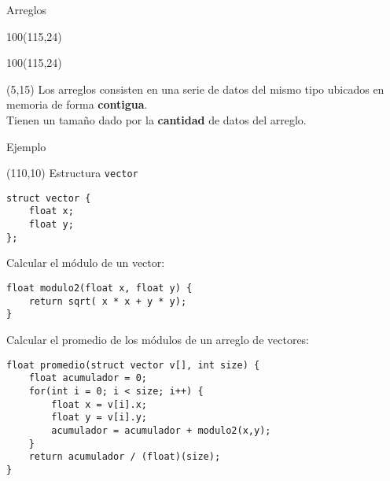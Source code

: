 \documentclass[aspectratio=169]{beamer}
\begin{document}
\begin{frame}[fragile,t]{Arreglos}
    \begin{textblock}{100}(115,24)  \end{textblock}
    \begin{textblock}{100}(115,24)  \end{textblock}
    \begin{textblock}{45}(5,15)
    \small
    Los arreglos consisten en una serie de datos del mismo tipo ubicados en memoria de forma \textbf{contigua}.\\
    \bigskip
    Tienen un tamaño dado por la \textbf{cantidad} de datos del arreglo.\\
    \end{textblock}
\end{frame}

%     
%     
% 

\begin{frame}[fragile,t]{Ejemplo}
\begin{textblock}{87}(110,10)
\footnotesize
\textcolor{verdeuca}{Estructura \texttt{vector}}
\begin{verbatim}
struct vector {
    float x;
    float y;
};
\end{verbatim}
\end{textblock}
\small
\textcolor{verdeuca}{Calcular el módulo de un vector:}
\begin{verbatim}
float modulo2(float x, float y) {
    return sqrt( x * x + y * y);
}
\end{verbatim}
\textcolor{verdeuca}{Calcular el promedio de los módulos de un arreglo de vectores:}
\begin{verbatim}
float promedio(struct vector v[], int size) {
    float acumulador = 0;
    for(int i = 0; i < size; i++) {
        float x = v[i].x;
        float y = v[i].y;
        acumulador = acumulador + modulo2(x,y);
    }
    return acumulador / (float)(size);
}
\end{verbatim}
\end{frame}
\end{document}
